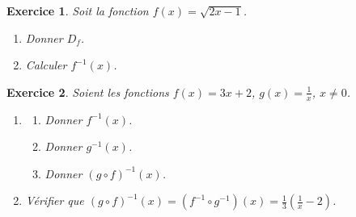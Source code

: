 \documentclass[12pt]{article}
\newtheorem{exercice}{\bf Exercice}
\newtheorem{correction}{\bf Correction exercice}
\newenvironment{exo}{
\begin{exercice}\smallskip\normalfont}{\end{exercice}
}
\newenvironment{cor}{
\begin{correction}\smallskip\normalfont}{\end{correction}
}
\newcommand*{\R}{\mathbb{R}}
\newif\ifcorrige\corrigefalse
\begin{document}


\begin{exo} Soit la fonction $f(x) = \sqrt{2x-1}$.
\begin{multicols}{2}
\begin{enumerate}
\item Donner $D_f$.
\item Calculer $f^{-1}(x)$.
\end{enumerate}
\end{multicols}
\end{exo}

\ifcorrige
\color{magenta}
\begin{cor}
  $\qquad$
\begin{enumerate}
\item La fonction $y \mapsto \sqrt{y}$ est d\'efinie pour $y \geq 0$.
  Dans notre cas, $y = 2x-1$ et $2x-1 \geq 0 \iff x \geq \frac12$.
  Donc $D_f = [ \frac12 , + \infty [$.
\item Calculons maintenant (si elle existe) l'inverse de $f$.
  Pour $y \in \R$, cherchons $x \geq \frac12$ tel que
  \begin{align*}
    y = f(x)
    \iff
    y = \sqrt{2x-1}
    \iff
    y^2 = 2x-1
    \iff
    x = \frac{y^2+1}{2}
  \end{align*}
  De plus, on a bien $\frac{y^2+1}{2} \geq 0$.
  Ainsi, pour chaque $y \in \R$, il existe un unique $x = \frac{y^2+1}{2} \in D_f$ tel que $f(x) = y$.
  La fonction $f$ est donc inversible et son inverse a pour expression $f^{-1}(x) = \frac{x^2+1}{2}$.
\end{enumerate}
\end{cor}
\color{black}
\fi


\begin{exo} Soient les fonctions $f(x) = 3x+2$, $g(x) = \frac1x$, $x \neq 0$.
\begin{enumerate}
\item 
\begin{multicols}{3}
\begin{enumerate}
\item Donner $f^{-1}(x)$.
\item Donner $g^{-1}(x)$.
\item Donner $(g \circ f)^{-1}(x)$.
\end{enumerate}
\end{multicols}
\item V\'erifier que $(g \circ f)^{-1}(x) = (f^{-1} \circ g^{-1})(x) = \frac13 (\frac1x - 2)$.
\end{enumerate}
\end{exo}
\end{document}
